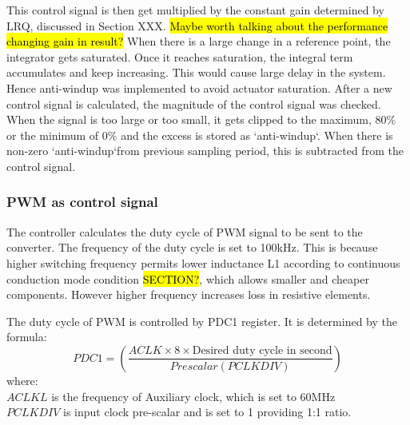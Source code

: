 This control signal is then get multiplied by the constant gain determined by LRQ, discussed in Section XXX. 
\hl{Maybe worth talking about the performance changing gain in result?}
\newpar
When there is a large change in a reference point, the integrator gets saturated. Once it reaches saturation, the integral term accumulates and keep increasing. This would cause large delay in the system. Hence anti-windup was implemented to avoid actuator saturation. After a new control signal is calculated, the magnitude of the control signal was checked. When the signal is too large or too small, it gets clipped to the maximum, 80\% or the minimum of 0\% and the excess is stored as \lq anti-windup\lq. When there is non-zero \lq anti-windup\lq from previous sampling period, this is subtracted from the control signal. 

\subsubsection{PWM as control signal}
The controller calculates the duty cycle of PWM signal to be sent to the converter. The frequency of the duty cycle is set to 100kHz. This is because higher switching frequency permits lower inductance L1 according to continuous conduction mode condition \hl{SECTION?}, which allows smaller and cheaper components. However higher frequency increases loss in resistive elements. 

\begin{comment}
  higher switching frequency permits lower inductance L1 (according to continuous conduction mode condition; i.e. allows smaller and cheaper components) but increases loss (in resistive elements). also higher switching frequency increases accuracy of state-space averaging technique (\cite{cuk})(may write something up on that; has to do with how L2 and C2 are essentially a lowpass filter and how the accuracy of state-space averaging depends on how much smaller the frequency of the filter they describe is than the the switching frequency)
\end{comment}

The duty cycle of PWM is controlled by PDC1 register. It is determined by the formula\cite{picPWM}:
\[
    PDC1 = \left( \frac{ACLK\times 8\times \text{Desired duty cycle in second}}{Prescalar (PCLKDIV)} \right)
\]
where:\\
$ACLKL$ is the frequency of Auxiliary clock, which is set to 60MHz\\
$PCLKDIV$ is input clock pre-scalar and is set to 1 providing 1:1 ratio. \\

